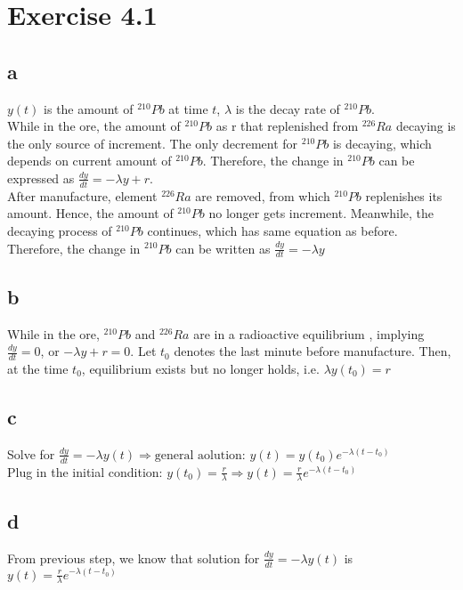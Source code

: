 \documentclass[11pt,letterpaper]{article}
\begin{document}
\section*{Exercise 4.1}
\subsection*{a}
\noindent $y(t)$ is the amount of $^{210}Pb$ at time $t$, $\lambda$ is the decay rate of $^{210}Pb$. \\

\noindent While in the ore, the amount of $^{210}Pb$ as r that replenished from $^{226}Ra$ decaying is the only source of increment. The only decrement for $^{210}Pb$ is decaying, which depends on current amount of $^{210}Pb$. Therefore, the change in $^{210}Pb$ can be expressed as $\frac{dy}{dt} = -\lambda y + r$. \\

\noindent After manufacture, element $^{226}Ra$ are removed, from which $^{210}Pb$ replenishes its amount. Hence, the amount of $^{210}Pb$ no longer gets increment. Meanwhile, the decaying process of $^{210}Pb$ continues, which has same equation as before. Therefore, the change in $^{210}Pb$ can be written as $\frac{dy}{dt} = -\lambda y $

\subsection*{b}
\noindent While in the ore, $^{210}Pb$ and $^{226}Ra$ are in a radioactive equilibrium , implying $\frac{dy}{dt} = 0$, or $- \lambda y+ r = 0$. Let $t_0$ denotes the last minute before manufacture. Then, at the time $t_0$, equilibrium exists but no longer holds, i.e. $\lambda y(t_0) = r$

\subsection*{c}
Solve for $\frac{dy}{dt} = -\lambda y(t) \Rightarrow \text{general aolution: } y(t) = y(t_0) e^{- \lambda (t - t_0)} $ \\

\noindent Plug in the initial condition: $y(t_0) = \frac{r}{\lambda} \Rightarrow y(t) = \frac{r}{\lambda} e^{-\lambda (t - t_0)}$

\subsection*{d}
\noindent From previous step, we know that solution for $\frac{dy}{dt} = -\lambda y(t)$ is $y(t) = \frac{r}{\lambda} e^{-\lambda (t - t_0)}$\\
\end{document}
